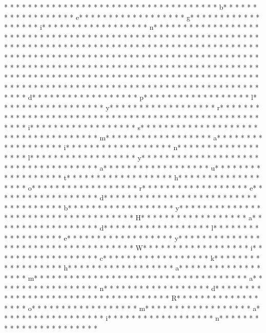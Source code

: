 * * *  * * *  * * *  *  * * *  *  * * *  * 	* * *  * * *  * * *  *  * * *  *  * * *  * b* * *  * * *  * * *  *  * * *  *  * * *  * e* * *  * * *  * * *  *  * * *  *  * * *  * g* * *  * * *  * * *  *  * * *  *  * * *  * i* * *  * * *  * * *  *  * * *  *  * * *  * n* * *  * * *  * * *  *  * * *  *  * * *  * {* * *  * * *  * * *  *  * * *  *  * * *  *  * * *  * * *  * * *  *  * * *  *  * * *  * }* * *  * * *  * * *  *  * * *  *  * * *  * 
* * *  * * *  * * *  *  * * *  *  * * *  * 	* * *  * * *  * * *  *  * * *  *  * * *  * 	* * *  * * *  * * *  *  * * *  *  * * *  * * *  * * *  *  * * *  *  * * *  * * *  * * *  *  * * *  *  * * *  *  * * *  * * *  * * *  *  * * *  *  * * *  *  * * *  * * *  * * *  *  * * *  *  * * *  *  * * *  * * *  * * *  *  * * *  *  * * *  *  * * *  * * *  * * *  *  * * *  *  * * *  *  * * *  * * *  * * *  *  * * *  *  * * *  *  * * *  * * *  * * *  *  * * *  *  * * *  *  * * *  * * *  * * *  *  * * *  *  * * *  * d* * *  * * *  * * *  *  * * *  *  * * *  * p* * *  * * *  * * *  *  * * *  *  * * *  * l* * *  * * *  * * *  *  * * *  *  * * *  * y* * *  * * *  * * *  *  * * *  *  * * *  * r* * *  * * *  * * *  *  * * *  *  * * *  *  * * *  * * *  * * *  *  * * *  *  * * *  *  * * *  * * *  * * *  *  * * *  *  * * *  * i* * *  * * *  * * *  *  * * *  *  * * *  * s* * *  * * *  * * *  *  * * *  *  * * *  *  * * *  * * *  * * *  *  * * *  *  * * *  * m* * *  * * *  * * *  *  * * *  *  * * *  * a* * *  * * *  * * *  *  * * *  *  * * *  * i* * *  * * *  * * *  *  * * *  *  * * *  * n* * *  * * *  * * *  *  * * *  *  * * *  * l* * *  * * *  * * *  *  * * *  *  * * *  * y* * *  * * *  * * *  *  * * *  *  * * *  *  * * *  * * *  * * *  *  * * *  *  * * *  * a* * *  * * *  * * *  *  * * *  *  * * *  * u* * *  * * *  * * *  *  * * *  *  * * *  * t* * *  * * *  * * *  *  * * *  *  * * *  * h* * *  * * *  * * *  *  * * *  *  * * *  * o* * *  * * *  * * *  *  * * *  *  * * *  * r* * *  * * *  * * *  *  * * *  *  * * *  * e* * *  * * *  * * *  *  * * *  *  * * *  * d* * *  * * *  * * *  *  * * *  *  * * *  *  * * *  * * *  * * *  *  * * *  *  * * *  * b* * *  * * *  * * *  *  * * *  *  * * *  * y* * *  * * *  * * *  *  * * *  *  * * *  *  * * *  * * *  * * *  *  * * *  *  * * *  * H* * *  * * *  * * *  *  * * *  *  * * *  * a* * *  * * *  * * *  *  * * *  *  * * *  * d* * *  * * *  * * *  *  * * *  *  * * *  * l* * *  * * *  * * *  *  * * *  *  * * *  * e* * *  * * *  * * *  *  * * *  *  * * *  * y* * *  * * *  * * *  *  * * *  *  * * *  *  * * *  * * *  * * *  *  * * *  *  * * *  * W* * *  * * *  * * *  *  * * *  *  * * *  * i* * *  * * *  * * *  *  * * *  *  * * *  * c* * *  * * *  * * *  *  * * *  *  * * *  * k* * *  * * *  * * *  *  * * *  *  * * *  * h* * *  * * *  * * *  *  * * *  *  * * *  * a* * *  * * *  * * *  *  * * *  *  * * *  * m* * *  * * *  * * *  *  * * *  *  * * *  *  * * *  * * *  * * *  *  * * *  *  * * *  * a* * *  * * *  * * *  *  * * *  *  * * *  * n* * *  * * *  * * *  *  * * *  *  * * *  * d* * *  * * *  * * *  *  * * *  *  * * *  *  * * *  * * *  * * *  *  * * *  *  * * *  * R* * *  * * *  * * *  *  * * *  *  * * *  * o* * *  * * *  * * *  *  * * *  *  * * *  * m* * *  * * *  * * *  *  * * *  *  * * *  * a* * *  * * *  * * *  *  * * *  *  * * *  * i* * *  * * *  * * *  *  * * *  *  * * *  * n* * *  * * *  * * *  *  * * *  *  * * *  *  * * *  * * 